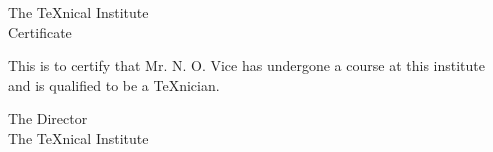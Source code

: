 \documentclass{article}
\begin{document}
  \begin{center}
    The \TeX nical Institute \\[.75cm]
    Certificate
  \end{center}
  \noindent This is to certify that Mr. N. O. Vice has undergone a course at this institute
       and is qualified to be a \TeX nician.
  \begin{flushright}
    The Director\\
    The \TeX nical Institute
  \end{flushright}
  
\end{document}

